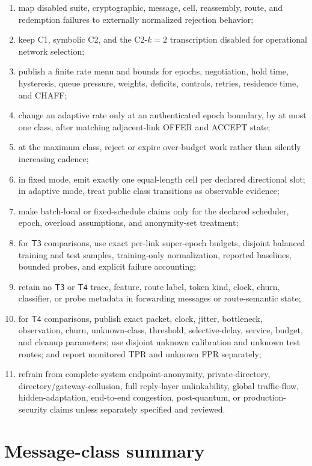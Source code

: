 \documentclass[11pt,oneside]{article}
\newcommand{\Tthree}{\ensuremath{\mathsf{T3}}}
\newcommand{\Tfour}{\ensuremath{\mathsf{T4}}}
\begin{document}
\begin{enumerate}
  \item map disabled suite, cryptographic, message, cell, reassembly, route, and redemption failures to externally normalized rejection behavior;
  \item keep C1, symbolic C2, and the C2-$k=2$ transcription disabled for operational network selection;
  \item publish a finite rate menu and bounds for epochs, negotiation, hold time, hysteresis, queue pressure, weights, deficits, controls, retries, residence time, and CHAFF;
  \item change an adaptive rate only at an authenticated epoch boundary, by at most one class, after matching adjacent-link OFFER and ACCEPT state;
  \item at the maximum class, reject or expire over-budget work rather than silently increasing cadence;
  \item in fixed mode, emit exactly one equal-length cell per declared directional slot; in adaptive mode, treat public class transitions as observable evidence;
  \item make batch-local or fixed-schedule claims only for the declared scheduler, epoch, overload assumptions, and anonymity-set treatment;
  \item for \Tthree{} comparisons, use exact per-link super-epoch budgets, disjoint balanced training and test samples, training-only normalization, reported baselines, bounded probes, and explicit failure accounting;
  \item retain no \Tthree{} or \Tfour{} trace, feature, route label, token kind, clock, churn, classifier, or probe metadata in forwarding messages or route-semantic state;
  \item for \Tfour{} comparisons, publish exact packet, clock, jitter, bottleneck, observation, churn, unknown-class, threshold, selective-delay, service, budget, and cleanup parameters; use disjoint unknown calibration and unknown test routes; and report monitored TPR and unknown FPR separately;
  \item refrain from complete-system endpoint-anonymity, private-directory, directory/gateway-collusion, full reply-layer unlinkability, global traffic-flow, hidden-adaptation, end-to-end congestion, post-quantum, or production-security claims unless separately specified and reviewed.
\end{enumerate}

\section{Message-class summary}
\label{app:messages}
\end{document}
